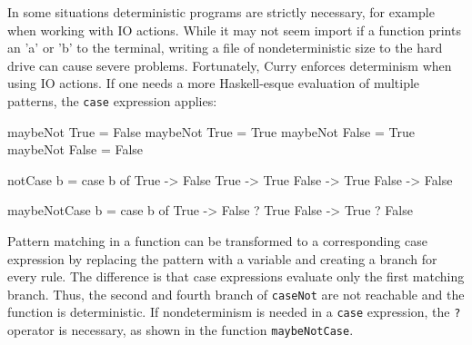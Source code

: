 \documentclass[paper = a4, fleqn, twoside]{scrreprt}
\begin{document}
\par
In some situations deterministic programs are strictly necessary, for example when working with IO actions. While it may not seem import if a function prints an 'a' or 'b' to the terminal, writing a file of nondeterministic size to the hard drive can cause severe problems. Fortunately, Curry enforces determinism when using IO actions. If one needs a more Haskell-esque evaluation of multiple patterns, the \texttt{case} expression applies:
\label{currycase}
\begin{flushleft}
	\begin{minipage}[t]{.3 \linewidth}
		\begin{haskellcode}
maybeNot True  = False
maybeNot True  = True
maybeNot False = True
maybeNot False = False
		\end{haskellcode}
	\end{minipage}
	\hfill
	\vrule
	\hspace{.5 em}
	\begin{minipage}[t]{.25 \linewidth}
		\begin{haskellcode}
notCase b =
  case b of
    True  -> False
    True  -> True
    False -> True
    False -> False
		\end{haskellcode}
	\end{minipage}
	\hfill
	\vrule
	\hspace{.5 em}
	\begin{minipage}[t]{.35 \linewidth}
		\begin{haskellcode}
maybeNotCase b =
  case b of
    True  -> False ? True 
    False -> True  ? False
		\end{haskellcode}
	\end{minipage}
\end{flushleft}
Pattern matching in a function can be transformed to a corresponding case expression by replacing the pattern with a variable and creating a branch for every rule. The difference is that case expressions evaluate only the first matching branch. Thus, the second and fourth branch of \texttt{caseNot} are not reachable and the function is deterministic. If nondeterminism is needed in a \texttt{case} expression, the \texttt{?} operator is necessary, as shown in the function \texttt{maybeNotCase}.
\end{document}
